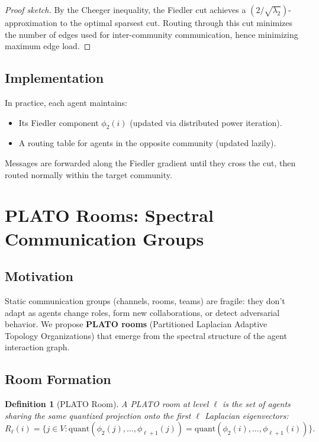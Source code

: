 \documentclass[11pt,a4paper]{article}
\newtheorem{definition}[theorem]{Definition}
\begin{document}
\begin{proof}[Proof sketch]
By the Cheeger inequality, the Fiedler cut achieves a $(2/\sqrt{\lambda_2})$-
approximation to the optimal sparsest cut.  Routing through this cut minimizes
the number of edges used for inter-community communication, hence minimizing
maximum edge load.
\end{proof}

\subsection{Implementation}

In practice, each agent maintains:
\begin{itemize}
  \item Its Fiedler component $\phi_2(i)$ (updated via distributed power
        iteration).
  \item A routing table for agents in the opposite community (updated lazily).
\end{itemize}

Messages are forwarded along the Fiedler gradient until they cross the cut,
then routed normally within the target community.

\section{PLATO Rooms: Spectral Communication Groups}
\label{sec:plato}

\subsection{Motivation}

Static communication groups (channels, rooms, teams) are fragile: they don't
adapt as agents change roles, form new collaborations, or detect adversarial
behavior.  We propose \textbf{PLATO rooms} (Partitioned Laplacian Adaptive
Topology Organizations) that emerge from the spectral structure of the agent
interaction graph.

\subsection{Room Formation}

\begin{definition}[PLATO Room]
A PLATO room at level $\ell$ is the set of agents sharing the same quantized
projection onto the first $\ell$ Laplacian eigenvectors:
\[
  R_{\ell}(i) = \{j \in V : \mathrm{quant}(\phi_2(j), \ldots, \phi_{\ell+1}(j)) = \mathrm{quant}(\phi_2(i), \ldots, \phi_{\ell+1}(i))\}.
\]
\end{definition}
\end{document}
